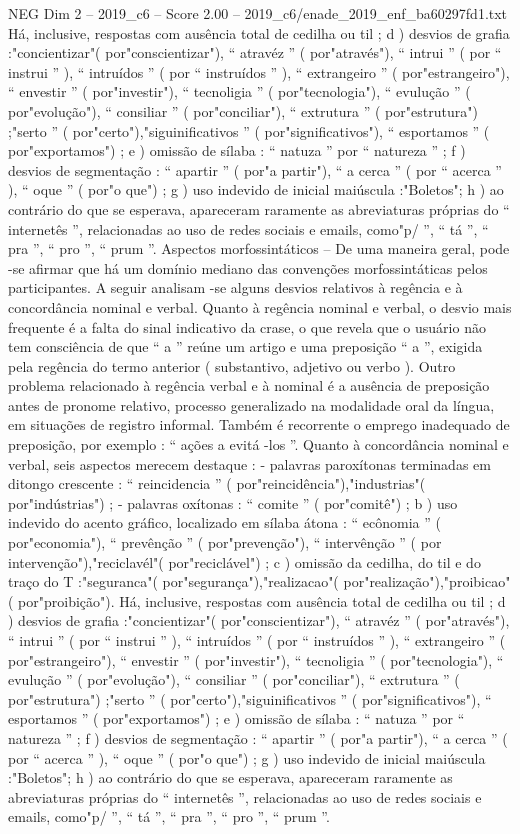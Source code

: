 \begin{textsample}{NEG Dim 2 – 2019\_c6 – Score 2.00 – 2019\_c6/enade\_2019\_enf\_ba60297fd1.txt}
Há, inclusive, respostas com ausência total de cedilha ou til ; d ) desvios de grafia :"concientizar"( por"conscientizar"), “ atravéz ” ( por"através"), “ intrui ” ( por “ instrui ” ), “ intruídos ” ( por “ instruídos ” ), “ extrangeiro ” ( por"estrangeiro"), “ envestir ” ( por"investir"), “ tecnoligia ” ( por"tecnologia"), “ evulução ” ( por"evolução"), “ consiliar ” ( por"conciliar"), “ extrutura ” ( por"estrutura") ;"serto ” ( por"certo"),"siguinificativos ” ( por"significativos"), “ esportamos ” ( por"exportamos") ; e ) omissão de sílaba : “ natuza ” por “ natureza ” ; f ) desvios de segmentação : “ apartir ” ( por"a partir"), “ a cerca ” ( por “ acerca ” ), “ oque ” ( por"o que") ; g ) uso indevido de inicial maiúscula :"Boletos"; h ) ao contrário do que se esperava, apareceram raramente as abreviaturas próprias do “ internetês ”, relacionadas ao uso de redes sociais e emails, como"p/ ”, “ tá ”, “ pra ”, “ pro ”, “ prum ”.
Aspectos morfossintáticos – De uma maneira geral, pode -se afirmar que há um domínio mediano das convenções morfossintáticas pelos participantes.
A seguir analisam -se alguns desvios relativos à regência e à concordância nominal e verbal.
Quanto à regência nominal e verbal, o desvio mais frequente é a falta do sinal indicativo da crase, o que revela que o usuário não tem consciência de que “ a ” reúne um artigo e uma preposição “ a ”, exigida pela regência do termo anterior ( substantivo, adjetivo ou verbo ).
Outro problema relacionado à regência verbal e à nominal é a ausência de preposição antes de pronome relativo, processo generalizado na modalidade oral da língua, em situações de registro informal.
Também é recorrente o emprego inadequado de preposição, por exemplo : “ ações a evitá -los ”.
Quanto à concordância nominal e verbal, seis aspectos merecem destaque : - palavras paroxítonas terminadas em ditongo crescente : “ reincidencia ” ( por"reincidência"),"industrias"( por"indústrias") ; - palavras oxítonas : “ comite ” ( por"comitê") ; b ) uso indevido do acento gráfico, localizado em sílaba átona : “ ecônomia ” ( por"economia"), “ prevênção ” ( por"prevenção"), “ intervênção ” ( por intervenção"),"reciclavél"( por"reciclável") ; c ) omissão da cedilha, do til e do traço do T :"seguranca"( por"segurança"),"realizacao"( por"realização"),"proibicao"( por"proibição").
Há, inclusive, respostas com ausência total de cedilha ou til ; d ) desvios de grafia :"concientizar"( por"conscientizar"), “ atravéz ” ( por"através"), “ intrui ” ( por “ instrui ” ), “ intruídos ” ( por “ instruídos ” ), “ extrangeiro ” ( por"estrangeiro"), “ envestir ” ( por"investir"), “ tecnoligia ” ( por"tecnologia"), “ evulução ” ( por"evolução"), “ consiliar ” ( por"conciliar"), “ extrutura ” ( por"estrutura") ;"serto ” ( por"certo"),"siguinificativos ” ( por"significativos"), “ esportamos ” ( por"exportamos") ; e ) omissão de sílaba : “ natuza ” por “ natureza ” ; f ) desvios de segmentação : “ apartir ” ( por"a partir"), “ a cerca ” ( por “ acerca ” ), “ oque ” ( por"o que") ; g ) uso indevido de inicial maiúscula :"Boletos"; h ) ao contrário do que se esperava, apareceram raramente as abreviaturas próprias do “ internetês ”, relacionadas ao uso de redes sociais e emails, como"p/ ”, “ tá ”, “ pra ”, “ pro ”, “ prum ”.

\end{textsample}

